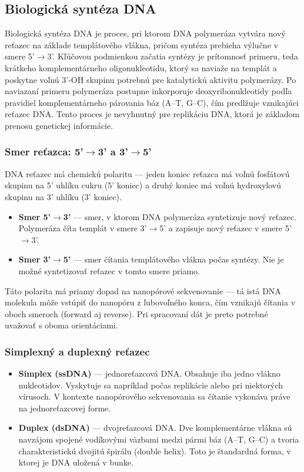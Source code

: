 \subsection{Biologická syntéza DNA}

Biologická syntéza DNA je proces,
pri ktorom DNA polymeráza vytvára
nový reťazec na základe templátového vlákna, pričom syntéza
prebieha výlučne v smere 5'$\rightarrow$3'. Kľúčovou podmienkou začatia 
syntézy je prítomnosť primeru, teda krátkeho komplementárneho
oligonukleotidu, ktorý sa naviaže na templát a poskytne voľnú
3'-OH skupinu potrebnú pre katalytickú aktivitu polymerázy. 
Po naviazaní primeru polymeráza postupne inkorporuje deoxyribonukleotidy 
podľa pravidiel komplementárneho párovania báz (A--T, G--C), čím predlžuje 
vznikajúci reťazec DNA. Tento proces je nevyhnutný pre replikáciu DNA, ktorá je základom
prenosu genetickej informácie.

\subsubsection{Smer reťazca: 5'$\rightarrow$3' a 3'$\rightarrow$5'}

DNA reťazec má chemickú polaritu --- jeden koniec reťazca má voľnú fosfátovú skupinu na 5' uhlíku cukru (5' koniec) a druhý koniec má voľnú hydroxylovú skupinu na 3' uhlíku (3' koniec).

\begin{itemize}
    \item \textbf{Smer 5'$\rightarrow$3'} --- smer, v ktorom DNA polymeráza syntetizuje nový reťazec. Polymeráza číta templát v smere 3'$\rightarrow$5' a zapisuje nový reťazec v smere 5'$\rightarrow$3'.
    \item \textbf{Smer 3'$\rightarrow$5'} --- smer čítania templátového vlákna počas syntézy. Nie je možné syntetizovať reťazec v tomto smere priamo.
\end{itemize}

Táto polarita má priamy dopad na nanopórové sekvenovanie --- tá istá DNA molekula môže vstúpiť do nanopóru z ľubovoľného konca, čím vznikajú čítania v oboch smeroch (forward aj reverse). Pri spracovaní dát je preto potrebné uvažovať s oboma orientáciami.

\subsubsection{Simplexný a duplexný reťazec}

\begin{itemize}
    \item \textbf{Simplex (ssDNA)} --- jednoreťazcová DNA. Obsahuje iba jedno vlákno nukleotidov. Vyskytuje sa napríklad počas replikácie alebo pri niektorých vírusoch. V kontexte nanopórového sekvenovania sa čítanie vykonáva práve na jednoreťazcovej forme.
    \item \textbf{Duplex (dsDNA)} --- dvojreťazcová DNA. Dve komplementárne vlákna sú navzájom spojené vodíkovými väzbami medzi pármi báz (A--T, G--C) a tvoria charakteristickú dvojitú špirálu (double helix). Toto je štandardná forma, v ktorej je DNA uložená v bunke.
\end{itemize}


